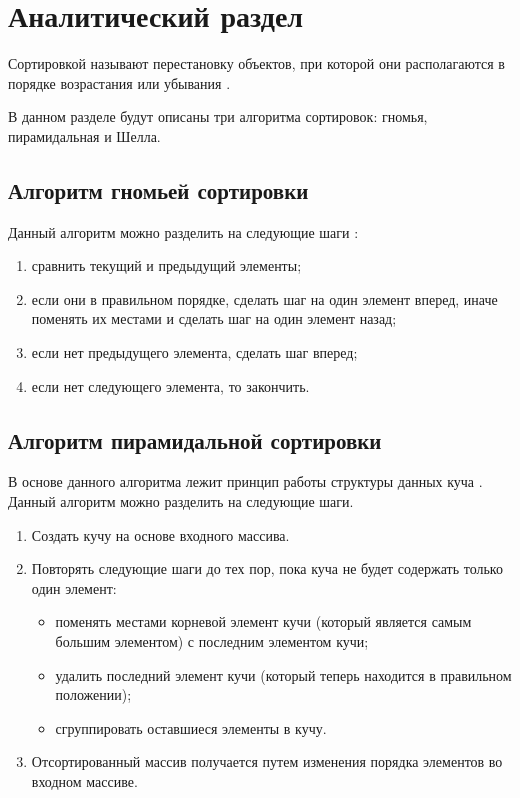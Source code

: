 \chapter{Аналитический раздел}

Сортировкой называют перестановку объектов, при которой они располагаются в порядке возрастания или убывания \cite{knut}.

В данном разделе будут описаны три алгоритма сортировок: гномья, пирамидальная и Шелла.

\section{Алгоритм гномьей сортировки}
Данный алгоритм можно разделить на следующие шаги \cite{gnome}:

\begin{enumerate}
	\item сравнить текущий и предыдущий элементы;
	\item если они в правильном порядке, сделать шаг на один элемент вперед, иначе поменять их местами и сделать шаг на один элемент назад;
	\item если нет предыдущего элемента, сделать шаг вперед;
	\item если нет следующего элемента, то закончить.
\end{enumerate}


\section{Алгоритм пирамидальной сортировки}

В основе данного алгоритма лежит принцип работы структуры данных куча \cite{heap}.
Данный алгоритм можно разделить на следующие шаги.

\begin{enumerate}
	\item Создать кучу на основе входного массива.
	\item Повторять следующие шаги до тех пор, пока куча не будет содержать только один элемент:
	\begin{itemize}
		\item поменять местами корневой элемент кучи (который является самым большим элементом) с последним элементом кучи;
		\item удалить последний элемент кучи (который теперь находится в правильном положении);
		\item сгруппировать оставшиеся элементы в кучу.
	\end{itemize}
	\item Отсортированный массив получается путем изменения порядка элементов во входном массиве.
\end{enumerate}


